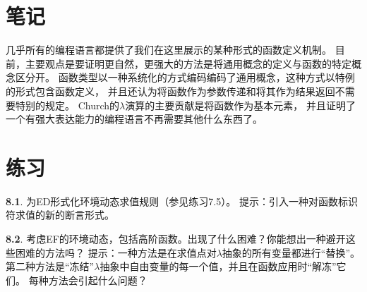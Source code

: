 \section{笔记}
几乎所有的编程语言都提供了我们在这里展示的某种形式的函数定义机制。
目前，主要观点是要证明更自然，更强大的方法是将通用概念的定义与函数的特定概念区分开。
函数类型以一种系统化的方式编码编码了通用概念，这种方式以特例的形式包含函数定义，
并且还认为将函数作为参数传递和将其作为结果返回不需要特别的规定。
Church的$\lambda$演算的主要贡献是将函数作为基本元素，
并且证明了一个有强大表达能力的编程语言不再需要其他什么东西了。

\section*{练习}
\textbf{8.1}. 为ED形式化环境动态求值规则（参见练习7.5）。
提示：引入一种对函数标识符求值的新的断言形式。

\textbf{8.2}. 考虑EF的环境动态，包括高阶函数。出现了什么困难？你能想出一种避开这些困难的方法吗？
提示：一种方法是在求值点对$\lambda$抽象的所有变量都进行“替换”。
第二种方法是“冻结”$\lambda$抽象中自由变量的每一个值，并且在函数应用时“解冻”它们。
每种方法会引起什么问题？
